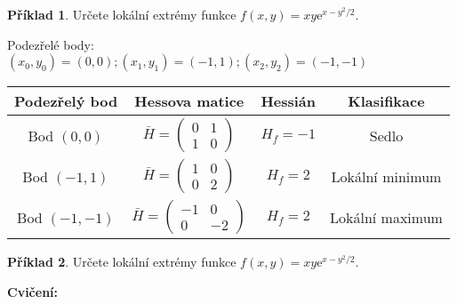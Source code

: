 \documentclass{article}
\theoremstyle{definition}
\newtheorem{exmp}{Příklad}[section]
\newcommand{\e}[1]{\mathrm{e}^{#1}}
\newenvironment{colbox}[1]
  {\newcommand\colboxcolor{#1}%
   \begin{lrbox}{\selvestebox}%
   \begin{minipage}{\dimexpr\columnwidth-2\fboxsep\relax}}
  {\end{minipage}\end{lrbox}%
   \begin{center}
   \colorbox[HTML]{\colboxcolor}{\usebox{\selvestebox}}
   \end{center}}
\begin{document}
\begin{colbox}{DDDDDD}
\begin{exmp}
Určete lokální extrémy funkce $f(x,y)=xy\e{x-y^2/2}$.
\end{exmp}
\end{colbox}
Podezřelé body: $(x_0, y_0)=(0, 0); (x_1, y_1)=(-1, 1); (x_2, y_2)=(-1, -1)$
\begin{center}
\begin{tabular}{cccc}
    \centering
    Podezřelý bod & Hessova matice & Hessián & Klasifikace \\
    \hline
    Bod $(0, 0)$ & $\bar{H}=
    \begin{pmatrix}
        0 & 1 \\
        1 & 0
    \end{pmatrix} $ & $H_f=-1$ & Sedlo \\
    Bod $(-1, 1)$ & $\bar{H}=
    \begin{pmatrix}
        1 & 0 \\
        0 & 2
    \end{pmatrix} $ & $H_f=2$ & Lokální minimum \\
    Bod $(-1, -1)$ & $\bar{H}=
    \begin{pmatrix}
        -1 & 0 \\
        0 & -2
    \end{pmatrix} $ & $H_f=2$ & Lokální maximum \\
\end{tabular}
\end{center}

\begin{colbox}{DDDDDD}
\begin{exmp}
Určete lokální extrémy funkce $f(x,y)=xy\e{x-y^2/2}$.
\end{exmp}
\end{colbox}

\begin{colbox}{ADD8E6}
\textbf{Cvičení:}
\end{colbox}
\end{document}
